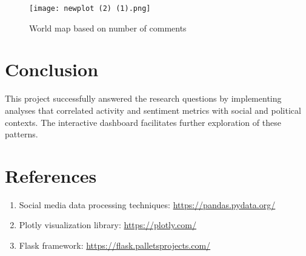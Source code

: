\documentclass[sigconf]{acmart}
\begin{document}
\begin{figure}
    \centering
    \texttt{[image: newplot (2) (1).png]}
    \caption{World map based on number of comments}
    \label{fig:enter-label}
\end{figure}

\section{Conclusion}
This project successfully answered the research questions by implementing analyses that correlated activity and sentiment metrics with social and political contexts. The interactive dashboard facilitates further exploration of these patterns.

\section*{References}
\begin{enumerate}
    \item Social media data processing techniques: \url{https://pandas.pydata.org/}
    \item Plotly visualization library: \url{https://plotly.com/}
    \item Flask framework: \url{https://flask.palletsprojects.com/}
\end{enumerate}
\end{document}
